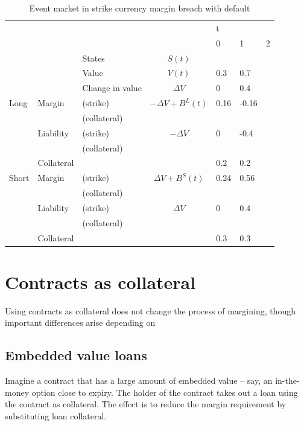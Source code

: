 \documentclass[12pt]{article}
\begin{document}
\begin{table}
\begin{tabular}{lll|c|lll}
&  &  &  & t & &\\  
&  &  &  & 0 & 1 & 2\\
\hline
&  & States &  $S(t)$ &   &   & \\
&  & Value  &  $V(t)$  & 0.3 & 0.7 &  \\
&  & Change in value & $\Delta V$ & 0& 0.4 &  \\
\hline
Long      & Margin    & (strike)     & $-\Delta V + B^L(t)$& 0.16 & -0.16 & \\
          &           & (collateral) & & & &\\ 
          & Liability & (strike)     & $-\Delta V$ & 0 & -0.4 & \\ 
          &           & (collateral)& & & &\\
          & Collateral&                       &    & 0.2 & 0.2 & \\
\hline          
Short     & Margin    & (strike)     & $\Delta V + B^S(t)$ & 0.24 & 0.56 & \\
          &           & (collateral) & & & &\\
          & Liability & (strike)     & $\Delta V$ & 0 & 0.4 &\\
          &           & (collateral) & & & &\\
          & Collateral&                       &    & 0.3 & 0.3 & \\ 
          
\end{tabular}
\caption{Event market in strike currency margin breach with default}
\label{fut}
\end{table}



\section{Contracts as collateral}

Using contracts as collateral does not change the process of margining, though important differences arise depending on 

\subsection{Embedded value loans}

Imagine a contract that has a large amount of embedded value -- say, an in-the-money option close to expiry. The holder of the contract takes out a loan using the contract as collateral. The effect is to reduce the margin requirement by substituting loan collateral. 
\end{document}
